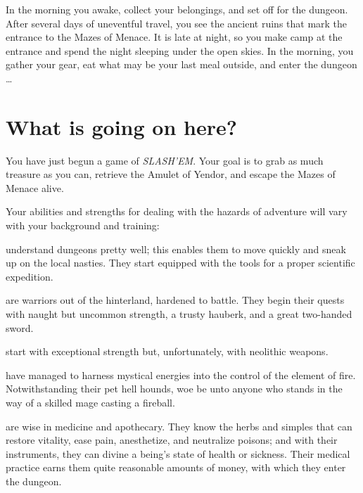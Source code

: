 
  In the morning you awake, collect your belongings, and 
set off for the dungeon.  After several days of uneventful 
travel, you see the ancient ruins that mark the entrance to the 
Mazes of Menace.  It is late at night, so you make camp at the entrance 
and spend the night sleeping under the open skies.  In the morning, you 
gather your gear, eat what may be your last meal outside, and enter the 
dungeon \ldots

\section{What is going on here?}


You have just begun a game of {\it SLASH'EM}.  Your goal is to grab as much
treasure as you can, retrieve the Amulet of Yendor, and escape the
Mazes of Menace alive.

Your abilities and strengths for dealing with the hazards of adventure
will vary with your background and training:
\blist{}

\item[\bb{Archeologists}]%
understand dungeons pretty well; this enables them
to move quickly and sneak up on the local nasties.  They start equipped
with the tools for a proper scientific expedition.

\item[\bb{Barbarians}]%
are warriors out of the hinterland, hardened to battle.
They begin their quests with naught but uncommon strength, a trusty hauberk,
and a great two-handed sword.

\item[\bb{Cavemen {\rm and }Cavewomen}]%
start with exceptional strength but,
unfortunately, with neolithic weapons.

\item[\bb{Flame Mages}]%
have managed to harness mystical energies into the control
of the element of fire.  Notwithstanding their pet hell hounds,  woe be unto
anyone who stands in the way of a skilled mage casting a fireball.

\item[\bb{Healers}]%
are wise in medicine and apothecary.  They know the
herbs and simples that can restore vitality, ease pain, anesthetize,
and neutralize poisons; and with their instruments, they can divine a
being's state of health or sickness.  Their medical practice earns them
quite reasonable amounts of money, with which they enter the dungeon.

